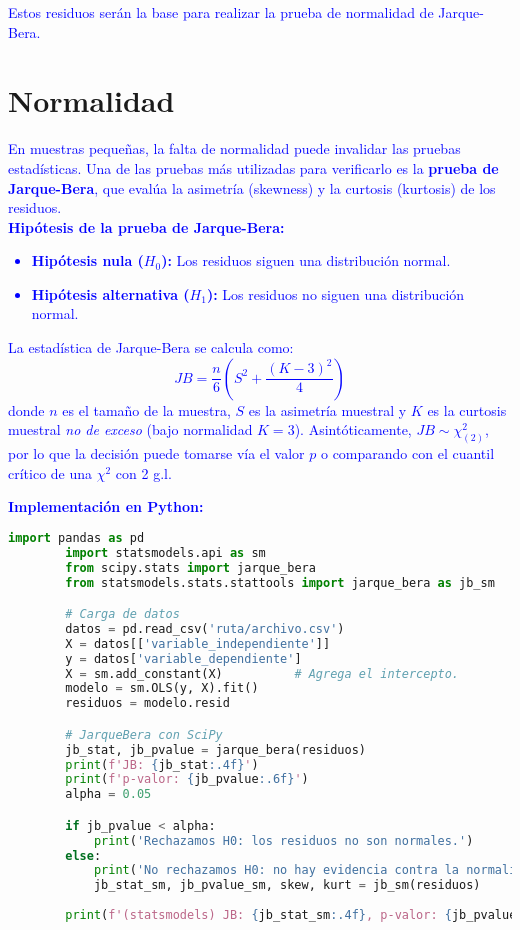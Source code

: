 \documentclass[10pt]{article}
\begin{document}
    \textcolor{blue}{
        Estos residuos serán la base para realizar la prueba de normalidad de Jarque-Bera.
    }
\section{Normalidad}
    \textcolor{blue}{
        En muestras pequeñas, la falta de normalidad puede invalidar las pruebas estadísticas. Una de las pruebas 
        más utilizadas para verificarlo es la \textbf{prueba de Jarque-Bera}, que evalúa la asimetría (skewness) y la curtosis
        (kurtosis) de los residuos.\\
        \textbf{Hipótesis de la prueba de Jarque-Bera:}
        \begin{itemize}
            \item \textbf{Hipótesis nula ($H_0$):} Los residuos siguen una distribución normal.
            \item \textbf{Hipótesis alternativa ($H_1$):} Los residuos no siguen una distribución normal.
        \end{itemize}
        La estadística de Jarque-Bera se calcula como:
        \[
        JB = \frac{n}{6} \left( S^2 + \frac{(K-3)^2}{4} \right)
        \]
        donde $n$ es el tamaño de la muestra, $S$ es la asimetría muestral y $K$ es la curtosis muestral \emph{no de exceso} (bajo normalidad $K=3$). Asintóticamente, $JB \sim \chi^2_{(2)}$, por lo que la decisión puede tomarse vía el valor $p$ o comparando con el cuantil crítico de una $\chi^2$ con 2 g.l.\\
    }
    \textcolor{blue}{
        \textbf{Implementación en Python:}
    }

    \begin{lstlisting}[language=Python]
        import pandas as pd
        import statsmodels.api as sm
        from scipy.stats import jarque_bera
        from statsmodels.stats.stattools import jarque_bera as jb_sm

        # Carga de datos
        datos = pd.read_csv('ruta/archivo.csv')
        X = datos[['variable_independiente']]
        y = datos['variable_dependiente']
        X = sm.add_constant(X)          # Agrega el intercepto.
        modelo = sm.OLS(y, X).fit()
        residuos = modelo.resid

        # JarqueBera con SciPy
        jb_stat, jb_pvalue = jarque_bera(residuos)
        print(f'JB: {jb_stat:.4f}')
        print(f'p-valor: {jb_pvalue:.6f}')
        alpha = 0.05

        if jb_pvalue < alpha:
            print('Rechazamos H0: los residuos no son normales.')
        else:
            print('No rechazamos H0: no hay evidencia contra la normalidad.')
            jb_stat_sm, jb_pvalue_sm, skew, kurt = jb_sm(residuos)
        
        print(f'(statsmodels) JB: {jb_stat_sm:.4f}, p-valor: {jb_pvalue_sm:.6f}, skew: {skew:.4f}, kurtosis: {kurt:.4f}')
    \end{lstlisting}
\end{document}
